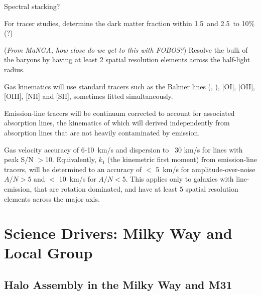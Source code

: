 \documentclass[11pt,a4paper,twoside,onecolumn,openany,final,oldfontcommands]{memoir}
\begin{document}
\begin{sciencerequirement}
\reqitem Spectral stacking?

\reqitem For tracer studies, determine the dark matter fraction within 1.5\Reff\ and 2.5\Reff\ to 10\% (?)


\reqitem (\emph{From MaNGA, how close do we get to this with FOBOS?}) Resolve the bulk of the baryons by having at least 2 spatial resolution elements across the half-light radius.

\reqitem  Gas kinematics will use standard tracers such as the Balmer lines (\Hbeta, \Halpha), [OI], [OII], [OIII], [NII] and [SII], sometimes fitted simultaneously. 

\reqitem  Emission-line tracers will be continuum corrected to account for associated absorption lines, the kinematics of which will derived independently from absorption lines that are not heavily contaminated by emission.

\reqitem Gas velocity accuracy of 6-10~km/s and dispersion to ~30 km/s for lines with peak S/N $>$10.  Equivalently, $k_1$ (the kinemetric first moment) from emission-line tracers, will be determined to an accuracy of $<$ 5~km/s for amplitude-over-noise $A/N>5$ and $<$ 10~km/s for $A/N<5$. This applies only to galaxies with line-emission, that are rotation dominated, and have at least 5 spatial resolution elements across the major axis. 

\end{sciencerequirement}

\newpage

\chapter{Science Drivers: Milky Way and Local Group} \label{sci:localgroup}

\section{Halo Assembly in the Milky Way and M31}
\end{document}
